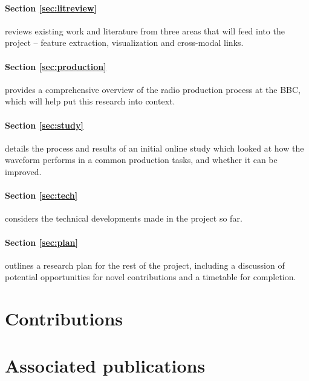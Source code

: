 \paragraph{Section \ref{sec:litreview}} reviews existing work and literature
from three areas that will feed into the project -- feature extraction,
visualization and cross-modal links.

\paragraph{Section \ref{sec:production}} provides a comprehensive overview of
the radio production process at the BBC, which will help put this research into
context.

\paragraph{Section \ref{sec:study}} details the process and results of an
initial online study which looked at how the waveform performs in a common
production tasks, and whether it can be improved.

\paragraph{Section \ref{sec:tech}} considers the technical developments made in
the project so far.

\paragraph{Section \ref{sec:plan}} outlines a research plan for the rest of the
project, including a discussion of potential opportunities for novel
contributions and a timetable for completion.

\section{Contributions}\label{sec:intro/contributions}

\section{Associated publications}\label{sec:intro/publications}
